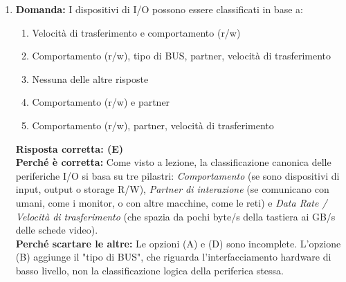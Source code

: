 \documentclass[12pt, a4paper]{article}
\begin{document}
\begin{enumerate}
\newpage
    
    \textbf{Risposta corretta: (B)} \\
    \textbf{Perché è corretta:} Nelle architetture RISC classiche (come MIPS o RISC-V), le costanti numeriche (immediati) sono inglobate nei 32 bit dell'istruzione stessa. Di conseguenza, possono occupare solo un sottoinsieme di bit (es. 16 bit nel MIPS o 12 bit nel RISC-V). Poiché la ALU opera fisicamente a 32 o 64 bit, l'hardware deve convertire questo piccolo numero in uno grande, replicando il bit di segno a sinistra per preservarne il valore matematico prima dell'operazione. \\
    \textbf{Perché scartare le altre:} I registri destinatario (C) si selezionano usando Multiplexer e campi a 5 bit, non con l'estensione del segno. L'estensione viene usata in tantissime istruzioni (Load, Store, Addi), non "solo" per i salti condizionati (E).

    \item \textbf{Domanda:} I dispositivi di I/O possono essere classificati in base a:
    \begin{enumerate}[label=(\Alph*)]
        \item Velocità di trasferimento e comportamento (r/w)
        \item Comportamento (r/w), tipo di BUS, partner, velocità di trasferimento
        \item Nessuna delle altre risposte
        \item Comportamento (r/w) e partner
        \item Comportamento (r/w), partner, velocità di trasferimento
    \end{enumerate}
    \textbf{Risposta corretta: (E)} \\
    \textbf{Perché è corretta:} Come visto a lezione, la classificazione canonica delle periferiche I/O si basa su tre pilastri: \textit{Comportamento} (se sono dispositivi di input, output o storage R/W), \textit{Partner di interazione} (se comunicano con umani, come i monitor, o con altre macchine, come le reti) e \textit{Data Rate / Velocità di trasferimento} (che spazia da pochi byte/s della tastiera ai GB/s delle schede video). \\
    \textbf{Perché scartare le altre:} Le opzioni (A) e (D) sono incomplete. L'opzione (B) aggiunge il "tipo di BUS", che riguarda l'interfacciamento hardware di basso livello, non la classificazione logica della periferica stessa.


\end{enumerate}
\end{document}
